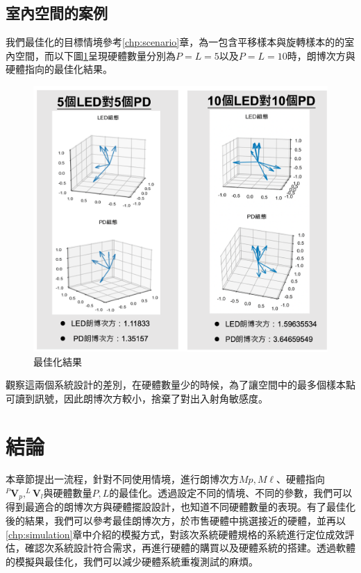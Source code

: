     \subsection{室內空間的案例}

    我們最佳化的目標情境參考\ref{chp:scenario}章，為一包含平移樣本與旋轉樣本的的室內空間，而以下圖\ref{pic:opt_result}呈現硬體數量分別為$P=L=5$以及$P=L=10$時，朗博次方與硬體指向的最佳化結果。

    \begin{figure}[htpb]
        \centering
        \includegraphics[width=15cm]{ch5pic/opt_result.png}
        \caption{最佳化結果}
        \label{pic:opt_result}
    \end{figure}

    觀察這兩個系統設計的差別，在硬體數量少的時候，為了讓空間中的最多個樣本點可讀到訊號，因此朗博次方較小，捨棄了對出入射角敏感度。



\section{結論}
\label{chp:5_conclu}

本章節提出一流程，針對不同使用情境，進行朗博次方$Mp,M\ell$、硬體指向$^{P}\boldsymbol{V}_p,^{L}\boldsymbol{V}_l$與硬體數量$P,L$的最佳化。透過設定不同的情境、不同的參數，我們可以得到最適合的朗博次方與硬體擺設設計，也知道不同硬體數量的表現。有了最佳化後的結果，我們可以參考最佳朗博次方，於市售硬體中挑選接近的硬體，並再以\ref{chp:simulation}章中介紹的模擬方式，對該次系統硬體規格的系統進行定位成效評估，確認次系統設計符合需求，再進行硬體的購買以及硬體系統的搭建。透過軟體的模擬與最佳化，我們可以減少硬體系統重複測試的麻煩。













